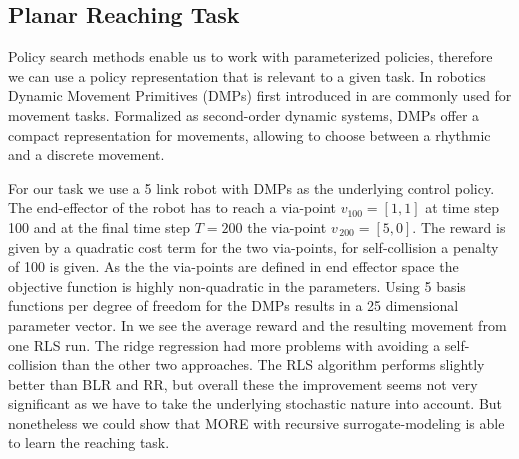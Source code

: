 
\subsection{Planar Reaching Task}
Policy search methods enable us to work with parameterized policies,
therefore we can use a policy representation that is relevant
to a given task.
In robotics Dynamic Movement Primitives 
(DMPs) first introduced in \citet{ijspeert2002learning} are
commonly used for movement tasks.
Formalized as second-order dynamic systems, DMPs offer a compact
representation for movements, allowing to choose between a rhythmic
and a discrete movement. 

For our task we use a 5 link robot with DMPs as the underlying
control policy. The end-effector of the robot has
to reach a via-point $v_{100} = [1,1]$ at time step 100
and at the final time step $T = 200$ the via-point $v_{\, 200} = [5,0]$.
The reward is given by a quadratic cost term for
the two via-points, for self-collision a penalty of 100 is given.
As the the via-points are defined in end effector space the objective
function is highly non-quadratic in the parameters. Using
5 basis functions per degree of freedom for the DMPs results
in a 25 dimensional parameter vector.
In  we see the average reward and the resulting
movement from one RLS run. The ridge regression had more problems
with avoiding a self-collision than the other two approaches.
The RLS algorithm performs slightly better than BLR and RR, but overall
these the improvement seems not very significant as we have to take the
underlying stochastic nature into account. But nonetheless we could show that
MORE with recursive surrogate-modeling is able to learn the reaching task.

